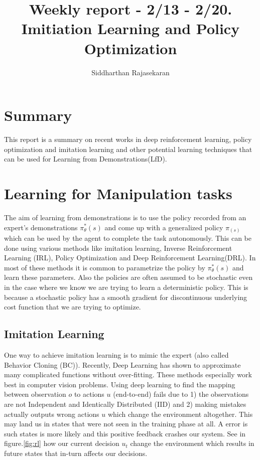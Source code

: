 \documentclass[11pt]{article}
\title{\large \textbf{Weekly report - 2/13 - 2/20. Imitiation Learning and Policy Optimization}}
\author{Siddharthan Rajasekaran}
\date{}
\begin{document}
\maketitle

\section{Summary}
This report is a summary on recent works in deep reinforcement learning, policy optimization and imitation learning and other potential learning techniques that can be used for Learning from Demonstrations(LfD).

\section{Learning for Manipulation tasks}

The aim of learning from demonstrations is to use the policy recorded from an expert's demonstrations $\pi^*_{\theta}(s)$ and come up with a generalized policy $\pi_(s)$ which can be used by the agent to complete the task autonomously. This can be done using various methods like imitation learning, Inverse Reinforcement Learning (IRL), Policy Optimization and Deep Reinforcement Learning(DRL). In most of these methods it is common to parametrize the policy by $\pi^*_{\theta}(s)$ and learn these parameters. Also the policies are often assumed to be stochastic even in the case where we know we are trying to learn a deterministic policy. This is because a stochastic policy has a smooth gradient for discontinuous underlying cost function that we are trying to optimize. 

\subsection{Imitation Learning} 
One way to achieve imitation learning is to mimic the expert (also called Behavior Cloning (BC)). Recently, Deep Learning has shown to approximate many complicated functions without over-fitting. These methods especially work best in computer vision problems. Using deep learning to find the mapping between observation $o$ to actions $u$ (end-to-end) fails due to 1) the observations are not Independent and Identically Distributed (IID) and 2) making mistakes actually outputs wrong actions $u$ which change the environment altogether. This may land us in states that were not seen in the training phase at all. A error is such states is more likely and this positive feedback crashes our system. See in figure.\ref{fig:rl} how our current decision $u_t$ change the environment which results in future states that in-turn affects our decisions. 
\end{document}
